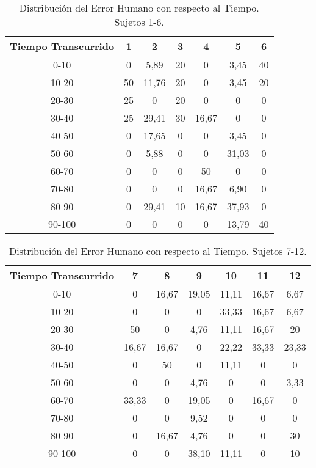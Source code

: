 \begin{table}[H]
\centering
\footnotesize
\begin{tabular}{|c|c|c|c|c|c|c|}
\hline
    Tiempo Transcurrido & 1 & 2 & 3 & 4 & 5 & 6 \\
\hline
0-10    &  0  &   5,89   &   20  &  0       &   3,45   &   40 \\
10-20   &  50 &   11,76  &   20  &  0       &   3,45   &   20 \\
20-30   &  25 &  0       &   20  &  0       &  0       &   0  \\
30-40   &  25 &   29,41  &   30  &   16,67  &  0       &   0  \\
40-50   &  0  &   17,65  &   0   &  0       &   3,45   &   0  \\
50-60   &  0  &   5,88   &   0   &  0       &   31,03  &   0  \\
60-70   &  0  &  0       &   0   &  50      &  0       &   0  \\
70-80   &  0  &  0       &   0   &   16,67  &   6,90   &   0  \\
80-90   &  0  &  29,41   &   10  &   16,67  &   37,93  &   0  \\
90-100  &  0  &  0       &   0   &  0       &   13,79  &   40 \\
\hline
\end{tabular}
\caption{Distribuci\'on del Error Humano con respecto al Tiempo. Sujetos 1-6.}
\label{sec:error-tiempo-1}
\end{table}

\begin{table}[H]
\centering
\footnotesize
\begin{tabular}{|c|c|c|c|c|c|c|}
\hline
    Tiempo Transcurrido & 7 & 8 & 9 & 10 & 11 & 12 \\
\hline
0-10    &  0        &  16,67 &  19,05 &  11,11 &  16,67 &  6,67 \\
10-20   &  0        &  0       &  0       &  33,33 &  16,67 &  6,67 \\
20-30   &  50       &  0       &  4,76  &  11,11 &  16,67 &  20 \\
30-40   &  16,67  &  16,67 &  0       &  22,22 &  33,33 &  23,33 \\
40-50   &  0        &  50      &  0       &  11,11 &  0       &  0 \\
50-60   &  0        &  0       &  4,76  &  0       &  0       &  3,33 \\
60-70   &  33,33  &  0       &  19,05 &  0       &  16,67 &  0 \\
70-80   &  0        &  0       &  9,52  &  0       &  0       &  0 \\
80-90   &  0        &  16,67 &  4,76  &  0       &  0       &  30 \\
90-100  &  0        &  0       &  38,10 &  11,11 &  0       &  10 \\
\hline
\end{tabular}
\caption{Distribuci\'on del Error Humano con respecto al Tiempo. Sujetos 7-12.}
\label{sec:error-tiempo-1}
\end{table}

